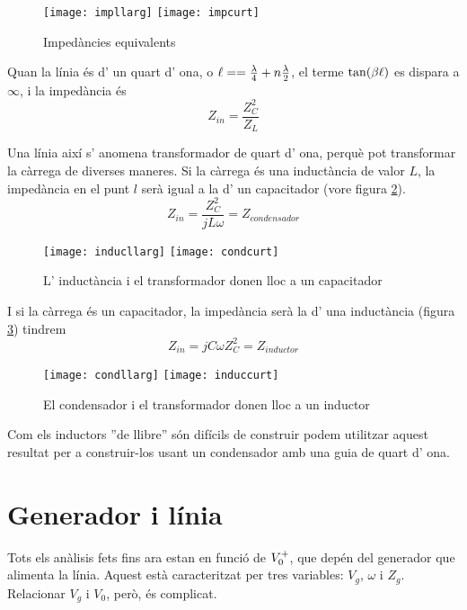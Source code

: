 \begin{figure}[ht]
  \centering
  \texttt{[image: impllarg]}
  \quad
  \texttt{[image: impcurt]}
  \caption{Impedàncies equivalents}
  \label{imptoimp}
\end{figure}

 Quan la línia és d' un quart d' ona, o $\ell =  = \frac{\lambda}{4} + n \frac{\lambda}{2}$, el terme $\tan (\beta \ell)$ es dispara a $\infty$, i la impedància és
\begin{equation}
  Z_{in} =  \frac{Z_C ^2}{Z_L}
\end{equation}

Una línia així s' anomena transformador de quart d' ona, perquè pot transformar la càrrega de diverses maneres. Si la càrrega és una inductància de valor $L$, la impedància en el punt $l$ serà igual a la d' un capacitador (vore figura \cref{indtocond}).
\begin{equation}
  Z_{in} = \frac{Z_C ^2}{jL\omega} = Z_{condensador}
\end{equation}

\begin{figure}[ht]
  \centering
  \texttt{[image: inducllarg]}
  \quad
  \texttt{[image: condcurt]}
  \caption{L' inductància i el transformador donen lloc a un capacitador}
  \label{indtocond}
\end{figure}

I si la càrrega és un capacitador, la impedància serà la d' una inductància (figura \cref{condtoind}) tindrem
\begin{equation}
  Z_{in} = j C \omega Z_C^2 = Z_{inductor}
\end{equation}

\begin{figure}[ht]
  \centering
  \texttt{[image: condllarg]}
  \quad
  \texttt{[image: induccurt]}
  \caption{El condensador i el transformador donen lloc a un inductor}
  \label{condtoind}
\end{figure}

Com els inductors ''de llibre'' són difícils de construir podem utilitzar aquest resultat per a construir-los usant un condensador amb una guia de quart d' ona.

\section{Generador i línia}

Tots els anàlisis fets fins ara estan en funció de $V_0 ^+$, que depén del generador que alimenta la línia. Aquest està caracteritzat per tres variables: $V_g$, $\omega$ i $Z_g$. Relacionar $V_g$ i $V_0$, però, és complicat.

